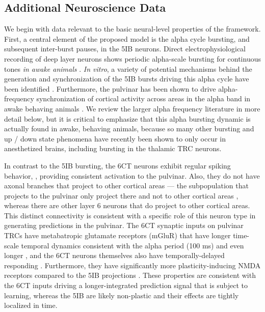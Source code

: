 \documentclass[11pt,twoside]{article}
\newif\myifpdf
\begin{document}
\subsection{Additional Neuroscience Data}

We begin with data relevant to the basic neural-level properties of the framework.  First, a central element of the proposed model is the alpha cycle bursting, and subsequent inter-burst pauses, in the 5IB neurons.  Direct electrophysiological recording of deep layer neurons shows periodic alpha-scale bursting for continuous tones \emph{in awake animals} \citep{LuczakBarthoHarris09,LuczakBarthoHarris13,SakataHarris09,SakataHarris12}.  \emph{In vitro}, a variety of potential mechanisms behind the generation and synchronization of the 5IB bursts driving this alpha cycle have been identified \citep{ConnorsGutnickPrince82,SilvaAmitaiConnors91,FranceschettiGuatteoPanzicaEtAl95}.  Furthermore, the pulvinar has been shown to drive alpha-frequency synchronization of cortical activity across areas in the alpha band in awake behaving animals \citep{SaalmannPinskWangEtAl12}.  We review the larger alpha frequency literature in more detail below, but it is critical to emphasize that this alpha bursting dynamic is actually found in awake, behaving animals, because so many other bursting and up / down state phenomena have recently been shown to only occur in anesthetized brains, including bursting in the thalamic TRC neurons.

In contrast to the 5IB bursting, the 6CT neurons exhibit regular spiking behavior,  \citep{Thomson10,ThomsonLamy07}, providing consistent activation to the pulvinar. Also, they do not have axonal branches that project to other cortical areas --- the subpopulation that projects to the pulvinar only project there and not to other cortical areas \citep{PetrofViaeneSherman12}, whereas there are other layer 6 neurons that do project to other cortical areas.  This distinct connectivity is consistent with a specific role of this neuron type in generating predictions in the pulvinar.   The 6CT synaptic inputs on pulvinar TRCs have metabatropic glutamate receptors (mGluR) that have longer time-scale temporal dynamics consistent with the alpha period (100 ms) and even longer \citep{Sherman14}, and the 6CT neurons themselves also have temporally-delayed responding \citep{HarrisShepherd15,SakataHarris09,Thomson10}.  Furthermore, they have significantly more plasticity-inducing NMDA receptors compared to the 5IB projections \citep{UsreySherman18}.  These properties are consistent with the 6CT inputs driving a longer-integrated prediction signal that is subject to learning, whereas the 5IB are likely non-plastic and their effects are tightly localized in time.
\end{document}
